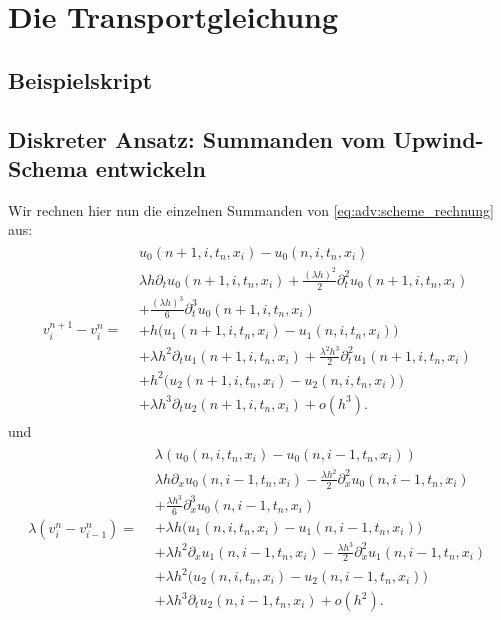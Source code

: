 \section{Die Transportgleichung}
\subsection{Beispielskript}
\label{appendix:transport:beispiel}


\subsection{Diskreter Ansatz: Summanden vom Upwind-Schema entwickeln}
\label{appendix:diskret:summanden}

Wir rechnen hier nun die einzelnen Summanden von \eqref{eq:adv:scheme_rechnung} aus:
{
\begin{align} \label{eq:transport:diskret:diff1}
v^{n+1}_i - v^n_i =
\begin{split}
& u_0(n+1, i, t_n, x_i) - u_0(n, i, t_n, x_i)\\
&\lambda h \partial_t u_0(n+1, i, t_n, x_i) + \frac {(\lambda h)^2}{2} \partial^2_t u_0(n+1, i, t_n, x_i)\\
&+ \frac {(\lambda h)^3}{6} \partial^3_t u_0(n+1, i, t_n, x_i)\\
&+ h \bigl( u_1(n+1, i, t_n, x_i) - u_1(n, i, t_n, x_i) \bigr)\\
&+ \lambda h^2 \partial_t u_1(n+1, i, t_n, x_i) + \frac {\lambda^2 h^3}{2} \partial^2_t u_1(n+1, i, t_n, x_i)\\
&+ h^2 \bigl( u_2(n+1, i, t_n, x_i) - u_2(n, i, t_n, x_i) \bigr)\\
&+ \lambda h^3 \partial_t u_2(n+1, i, t_n, x_i) + o(h^3).
\end{split}
\end{align}
} und
{ 
\begin{align} \label{eq:transport:diskret:diff2}
\lambda (v^n_i - v^n_{i-1}) =
\begin{split}
& \lambda( u_0(n, i, t_n, x_i) - u_0(n, i-1, t_n, x_i) )\\
&\lambda h \partial_x u_0(n, i-1, t_n, x_i) - \frac {\lambda h^2}{2} \partial^2_x u_0(n, i-1, t_n, x_i)\\
& + \frac {\lambda h^3}{6} \partial^3_x u_0(n, i-1, t_n, x_i)\\
&+ \lambda h \bigl( u_1(n, i, t_n, x_i) - u_1(n, i-1, t_n, x_i) \bigr)\\
&+ \lambda h^2 \partial_x u_1(n, i-1, t_n, x_i) - \frac {\lambda h^3}{2} \partial^2_x u_1(n, i-1, t_n, x_i)\\
&+ \lambda h^2 \bigl( u_2(n, i, t_n, x_i) - u_2(n, i-1, t_n, x_i) \bigr)\\
&+ \lambda h^3 \partial_t u_2(n, i-1, t_n, x_i) + o(h^2).
\end{split}
\end{align}
}

